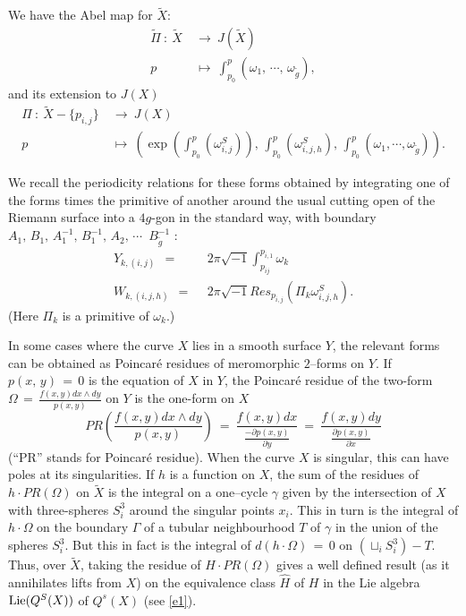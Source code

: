 \documentclass[12pt,reqno]{amsart}
\numberwithin{equation}{section}
\theoremstyle{definition}
\theoremstyle{remark}
\begin{document}
 
 

We have the Abel map for $\widetilde X$:
\begin{align}\nonumber
\widetilde \Pi\ :\ \widetilde X& \ \longrightarrow\ J(\widetilde X)\\
p&\ \longmapsto\ \int_{p_0}^p (\omega_1,\,\cdots ,\,\omega_{\widetilde g}),
\end{align}
and its extension to $J(X)$
\begin{align} \nonumber  \Pi\ :\ \widetilde X-\{p_{i,j}\}&\ \longrightarrow\ J(  X)\\
p&\ \longmapsto\ \left(\exp\left(\int_{p_0}^p( \omega^S_{i, j})\right),\, \int_{p_0}^p(\omega^S_{i,j,h}),\,
\int_{p_0}^p (\omega_1,\cdots ,\omega_{\widetilde g})\right).
\end{align}

We recall the periodicity relations for these forms obtained by integrating one of the forms times the 
primitive of another around the usual cutting open of the Riemann surface into a $4g$-gon in the standard 
way, with boundary
$A_1,\, B_1,\, A_1^{-1},\, B_1^{-1},\,A_2,\, \cdots\,$ $B_{\widetilde g}^{-1}$ : 
\begin{align} \label{reciprocity}
  Y_{k,(i, j) }\ \ =\ \ & 2\pi \sqrt{-1} \int^{p_{i,1}}_{p_{i j}} \omega_k\\
  W_{k,(i,j,h)}\ \ =\ \ & 2\pi\sqrt{-1}   Res_{p_{i,j}} (\Pi_k \omega^{S}_{i,j,h}).\end{align}
(Here $\Pi_k$ is a primitive of $\omega_k$.)

In some cases where the curve $X$ lies in a smooth surface $Y$, the relevant forms can be obtained as
Poincar\'e residues of meromorphic $2$--forms on $Y$. If $p(x,\,y)\,= \,0$ is the equation of $X$ in
$Y$, the Poincar\'e residue of  the two-form $\Omega \,=\, \frac{f(x,y) dx\wedge dy }{p(x,y)} $ on $Y$ is the one-form on $X$
$$PR(\frac{f(x,y) dx\wedge dy }{p(x,y)})\ =\ \frac{f(x,y) dx  }{\frac{-\partial p(x,y)}{\partial y} }
\ =\ \frac{f(x,y) dy  }{\frac{ \partial p(x,y)}{\partial x} }$$
(``PR'' stands for Poincar\'e residue).
When the curve $X$ is singular, this can have poles at its singularities. If $h$ is a function on $X$,
the sum of the residues of $h\cdot PR(\Omega)$ on $\widetilde X$ is the integral on a one--cycle $\gamma$
given by the intersection of $X$ with three-spheres $S^3_i$ around the singular points $x_i$. This in turn
is the integral of $h\cdot \Omega$ on the boundary $\Gamma$ of a tubular neighbourhood $T$ of $\gamma$
in the union of the spheres $S^3_i$. But this in fact is the integral of $d(h\cdot \Omega) \,=\, 0$
on $(\sqcup_i S^3_i)- T$. Thus, over $\widetilde X$, taking the residue 
of $H\cdot PR(\Omega)$ gives a well defined result (as it annihilates lifts from $X$) on the
equivalence class $\widehat H$ of $H$ in the Lie algebra ${\rm Lie}(Q^S(X))$ of $Q^s(X)$ (see
\eqref{e1}).
\end{document}
